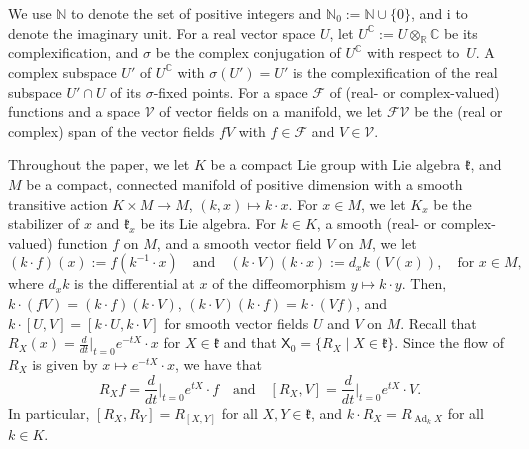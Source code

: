 \documentclass{article}
\newcommand{\N}{\mathbb{N}}
\newcommand{\R}{\mathbb{R}}
\newcommand{\C}{\mathbb{C}}
\newcommand{\frakk}{\mathfrak{k}}
\newcommand{\sX}{\mathsf{X}}
\newcommand{\xc}[1]{\vspace{.1cm}
\noindent {\em #1} }
\theoremstyle{definition}
\theoremstyle{plain}
\begin{document}
\xc{Notation:} We use $\N$ to denote the set of positive integers and $\N_0:=\N\cup\{0\}$, and $\mathrm{i}$ to denote the imaginary unit.
For a real vector space $U$, let $U^\C:=U \otimes_\R \C$ be its complexification, and $\sigma$ be the complex conjugation of $U^\C$ with respect to~$U$.   
A complex subspace $U'$ of $U^\C$ with $\sigma(U')=U'$ is the complexification of the real subspace $U'\cap U$ of its $\sigma$-fixed points.
For a space $\mathcal F$ of (real- or complex-valued) functions and a space $\mathcal V$ of vector fields on a manifold, we let $\mathcal F\mathcal V$ be the (real or complex) span of the vector fields $fV$ with $f\in\mathcal F$ and $V\in\mathcal V$.  

Throughout the paper, we let $K$ be a compact Lie group with Lie algebra $\frakk$, and $M$ be a compact, connected manifold of positive dimension with a smooth transitive action $K\times M\to M$, $(k,x)\mapsto k\cdot x$.
For $x\in M$, we let $K_x$ be the stabilizer of $x$ and $\frakk_x$ be its Lie algebra.
For $k\in K$, a smooth (real- or complex-valued) function $f$ on $M$, and a smooth vector field $V$ on $M$, we let
$$
    (k\cdot f)(x):= f(k^{-1}\cdot x) \quad\mbox{and}\quad
    (k\cdot V)(k\cdot x):= d_x k\,(V(x)), \quad\mbox{for } x\in M,
$$
where $d_x k$ is the differential at $x$ of the diffeomorphism $y\mapsto k\cdot y$.
Then, $k\cdot(fV)=(k\cdot f)(k\cdot V)$, $(k\cdot V)(k\cdot f)=k\cdot(Vf)$, and $k\cdot[U,V]=[k\cdot U,k\cdot V]$ for smooth vector fields $U$ and $V$ on $M$.
Recall that $R_X(x)=\frac{d}{dt} \big|_{t=0} e^{-tX}\cdot x$ for $X\in\frakk$ and that $\sX_0=\{R_X \mid X\in\frakk\}$.
Since the flow of $R_X$ is given by $x\mapsto e^{-tX}\cdot x$, we have that
\begin{equation}\label{eq:R-derivatives}
R_X f=\frac{d}{dt} \Big|_{t=0} e^{tX}\cdot f \quad\mbox{and}\quad
[R_X,V]=\frac{d}{dt} \Big|_{t=0} e^{tX}\cdot V.
\end{equation}
In particular, $[R_X,R_Y]=R_{[X,Y]}$ for all $X,Y\in\frakk$, and $k\cdot R_X=R_{\operatorname{Ad}_kX}$ for all $k\in K$.
\end{document}
